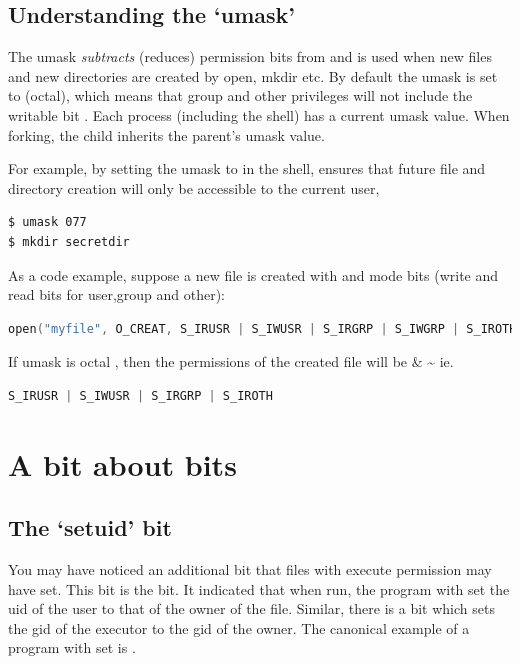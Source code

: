 \subsection{Understanding the `umask'}

The umask \emph{subtracts} (reduces) permission bits from  and is used when new files and new directories are created by open, mkdir etc. By default the umask is set to  (octal), which means that group and other privileges will not include the writable bit . Each process (including the shell) has a current umask value. When forking, the child inherits the parent's umask value.

For example, by setting the umask to  in the shell, ensures that future file and directory creation will only be accessible to the current user,

\begin{lstlisting}
$ umask 077
$ mkdir secretdir
\end{lstlisting}

As a code example, suppose a new file is created with  and mode bits  (write and read bits for user,group and other):

\begin{lstlisting}[language=C]
open("myfile", O_CREAT, S_IRUSR | S_IWUSR | S_IRGRP | S_IWGRP | S_IROTH | S_IWOTH);
\end{lstlisting}

If umask is octal , then the permissions of the created file will be  \& \textasciitilde{} ie.

\begin{lstlisting}[language=C]
S_IRUSR | S_IWUSR | S_IRGRP | S_IROTH
\end{lstlisting}

\section{A bit about bits}

\subsection{The `setuid' bit}

You may have noticed an additional bit that files with execute permission may have set. This bit is the  bit. It indicated that when run, the program with set the uid of the user to that of the owner of the file. Similar, there is a  bit which sets the gid of the executor to the gid of the owner. The canonical example of a program with  set is .

